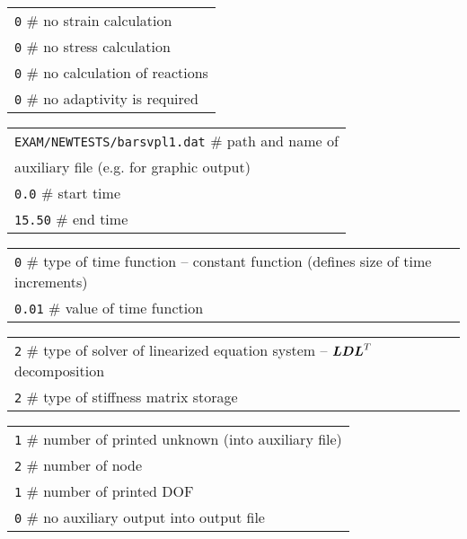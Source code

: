\vspace{2mm}
\noindent
\begin{tabular}{l}
{\tt 0} $\#$ no strain calculation
\\
{\tt 0} $\#$ no stress calculation
\\
{\tt 0} $\#$ no calculation of reactions
\\
{\tt 0} $\#$ no adaptivity is required
\\
\end{tabular}

\vspace{2mm}
\noindent
\begin{tabular}{l}
{\tt EXAM/NEWTESTS/barsvpl1.dat} $\#$ path and name of
\\ auxiliary file (e.g. for graphic output)
\\
{\tt 0.0} $\#$ start time
\\
{\tt 15.50} $\#$ end time
\\
\end{tabular}

\vspace{2mm}
\noindent
\begin{tabular}{l}
{\tt 0} $\#$ type of time function -- constant function (defines size of time increments)
\\
{\tt 0.01} $\#$ value of time function
\\
\end{tabular}

\vspace{2mm}
\noindent
\begin{tabular}{l}
{\tt 2} $\#$ type of solver of linearized equation system -- $\mbox{\boldmath$LDL$}^T$ decomposition
\\
{\tt 2} $\#$ type of stiffness matrix storage
\\
\end{tabular}

\vspace{2mm}
\noindent
\begin{tabular}{l}
{\tt 1} $\#$ number of printed unknown (into auxiliary file)
\\
{\tt 2} $\#$ number of node
\\
{\tt 1} $\#$ number of printed DOF
\\
{\tt 0} $\#$ no auxiliary output into output file
\end{tabular}


